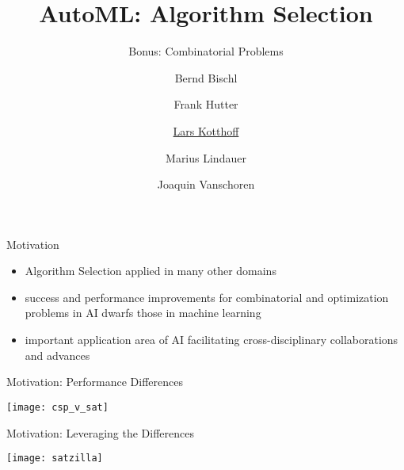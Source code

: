 


\title[AutoML: Overview]{AutoML: Algorithm Selection} %
\subtitle{Bonus: Combinatorial Problems} %
\author[Lars Kotthoff]{Bernd Bischl \and Frank Hutter \and \underline{Lars Kotthoff}\newline \and Marius Lindauer \and Joaquin Vanschoren}
\institute{}
\date{}




	
	\maketitle

\begin{frame}[c]{Motivation}
    \begin{itemize}
        \item Algorithm Selection applied in many other domains
        \item success and performance improvements for combinatorial and
            optimization problems in AI dwarfs those in machine learning
        \item important application area of AI facilitating cross-disciplinary
            collaborations and advances
    \end{itemize}
\end{frame}

\begin{frame}[c,allowframebreaks]{Motivation: Performance Differences }
\begin{center}
\texttt{[image: csp\_v\_sat]}
\end{center}

\end{frame}

\begin{frame}[c]{Motivation: Leveraging the Differences }
\begin{center}
\texttt{[image: satzilla]}
\end{center}
\end{frame}

